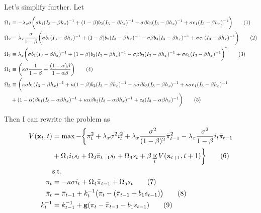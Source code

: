 \documentclass[11pt]{article}
\renewcommand{\[}{\begin{equation}}
\renewcommand{\]}{\end{equation}}
\DeclareMathOperator{\E}{\mathbb{E}}
\newcommand\numberthis{\addtocounter{equation}{1}\tag{\theequation}} %
\begin{document}
Let's simplify further. Let
\begin{align*}
\Omega_1 &\equiv -\lambda_x\sigma\bigg(\sigma b_1(I_3 - \beta h_x)^{-1}  +  (1-\beta)b_2 (I_3 - \beta h_x)^{-1} - \sigma\beta b_3 (I_3 - \beta h_x)^{-1} +\sigma e_1(I_3 - \beta h_x)^{-1}\bigg) \numberthis \\
\Omega_2 &\equiv \lambda_x \frac{\sigma}{1-\beta}\bigg(\sigma b_1(I_3 - \beta h_x)^{-1}  +  (1-\beta)b_2 (I_3 - \beta h_x)^{-1} - \sigma\beta b_3 (I_3 - \beta h_x)^{-1} +\sigma e_1(I_3 - \beta h_x)^{-1}\bigg) \numberthis\\
\Omega_3 &\equiv \lambda_x\bigg(\sigma b_1(I_3 - \beta h_x)^{-1}  +  (1-\beta)b_2 (I_3 - \beta h_x)^{-1} - \sigma\beta b_3 (I_3 - \beta h_x)^{-1} +\sigma e_1(I_3 - \beta h_x)^{-1}\bigg)^2 \numberthis\\
\Omega_4 & \equiv \bigg(\kappa\sigma \frac{1}{1-\beta} +  \frac{(1-\alpha)\beta}{1-\alpha\beta}\bigg) \numberthis \\
\Omega_5 &\equiv \bigg(\kappa\sigma b_1(I_3 - \beta h_x)^{-1}   +  \kappa(1-\beta)b_2 (I_3 - \beta h_x)^{-1} - \kappa\sigma\beta b_3 (I_3 - \beta h_x)^{-1}+\kappa\sigma e_1(I_3 - \beta h_x)^{-1}   \\
 &  + (1-\alpha)\beta b_1(I_3 - \alpha\beta h_x)^{-1}  +\kappa\alpha\beta b_2 (I_3 - \alpha\beta h_x)^{-1} +e_3(I_3 - \alpha\beta h_x)^{-1}\bigg)\numberthis
\end{align*}

Then I can rewrite the problem as
\begin{align*}
V(\mathbf{x}_t,t)& = \max -\bigg\{ \pi_t^2 +  \lambda_x\sigma^2 i_t^2 +\lambda_x\frac{\sigma^2}{(1-\beta)^2}\bar{\pi}_{t-1}^2 -\lambda_x\frac{\sigma^2}{1-\beta}i_t \bar{\pi}_{t-1} \\
&+\Omega_1i_ts_t + \Omega_2\bar{\pi}_{t-1}s_t +\Omega_3s_t + \beta \E_t V(\mathbf{x}_{t+1},t+1) \bigg\} \numberthis \\
& \text{s.t.} \\
 \pi_t & = -\kappa\sigma i_t +\Omega_4\bar{\pi}_{t-1}  +\Omega_5 s_t \numberthis \\
 \bar{\pi}_{t} & = \bar{\pi}_{t-1} + k_t^{-1}\big(\pi_{t} -(\bar{\pi}_{t-1}+b_1 s_{t-1}) \big)   \numberthis  \\
 k_t^{-1} & = k_{t-1}^{-1}+ \mathbf{g}(\pi_t - \bar{\pi}_{t-1}-b_1 s_{t-1})  \numberthis
\end{align*}
\end{document}
